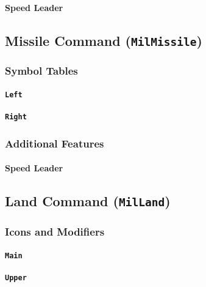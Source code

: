 \documentclass[a4paper, titlepage]{article}
\begin{document}
\paragraph{Speed Leader}

\subsection{Missile Command (\textbf{\texttt{MilMissile}})}

\subsubsection{Symbol Tables}

\paragraph{\texttt{Left}}
%

\paragraph{\texttt{Right}}
%

\subsubsection{Additional Features}

\paragraph{Speed Leader}

\subsection{Land Command (\textbf{\texttt{MilLand}})}

\subsubsection{Icons and Modifiers}

\paragraph{\texttt{Main}}
%

\paragraph{\texttt{Upper}}
%
\end{document}
